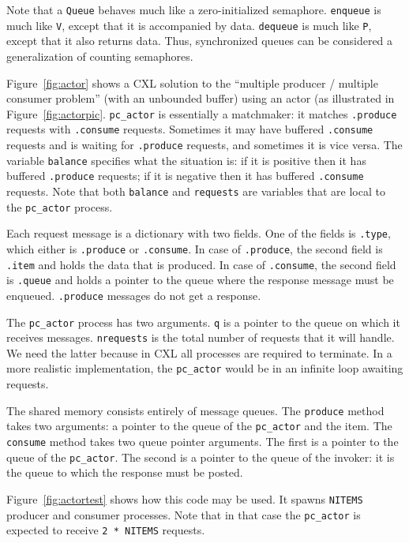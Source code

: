 \documentclass{report}
\begin{document}
Note that a \texttt{Queue} behaves much like a zero-initialized semaphore.
\texttt{enqueue} is much like \texttt{V}, except that it is accompanied by data.
\texttt{dequeue} is much like \texttt{P}, except that it also returns data.
Thus, synchronized queues can be considered a generalization of counting semaphores.

Figure~\ref{fig:actor} shows a CXL solution to the
``multiple producer / multiple consumer problem'' (with an unbounded buffer)
using an actor (as illustrated in Figure~\ref{fig:actorpic}.
\texttt{pc\_actor} is essentially a matchmaker: it matches
\texttt{.produce} requests with \texttt{.consume} requests.
Sometimes it may have buffered \texttt{.consume} requests and is waiting for
\texttt{.produce} requests, and sometimes it is vice versa.
The variable \texttt{balance} specifies what the situation is: if it is positive
then it has buffered \texttt{.produce} requests;
if it is negative
then it has buffered \texttt{.consume} requests.
Note that both \texttt{balance} and \texttt{requests} are variables that are
local to the \texttt{pc\_actor} process.

Each request message is a dictionary with two fields.  One of the fields is
\texttt{.type}, which either is \texttt{.produce} or \texttt{.consume}.
In case of \texttt{.produce}, the second field is \texttt{.item} and holds
the data that is produced.
In case of \texttt{.consume}, the second field is \texttt{.queue} and holds
a pointer to the queue where the response message must be enqueued.
\texttt{.produce} messages do not get a response.

The \texttt{pc\_actor} process has two arguments.  \texttt{q} is a pointer
to the queue on which it receives messages.  \texttt{nrequests} is the total
number of requests that it will handle.  We need the latter because in CXL
all processes are required to terminate.  In a more realistic implementation,
the \texttt{pc\_actor} would be in an infinite loop awaiting requests.

The shared memory consists entirely of message queues.
The \texttt{produce} method takes two arguments: a pointer to the queue
of the \texttt{pc\_actor} and the item.  The \texttt{consume} method
takes two queue pointer arguments.  The first is a pointer to the queue
of the \texttt{pc\_actor}.  The second is a pointer to the queue of the
invoker: it is the queue to which the response must be posted.

Figure~\ref{fig:actortest} shows how this code may be used.  It spawns
\texttt{NITEMS} producer and consumer processes.  Note that in that
case the \texttt{pc\_actor} is expected to receive \texttt{2 * NITEMS}
requests.
\end{document}
